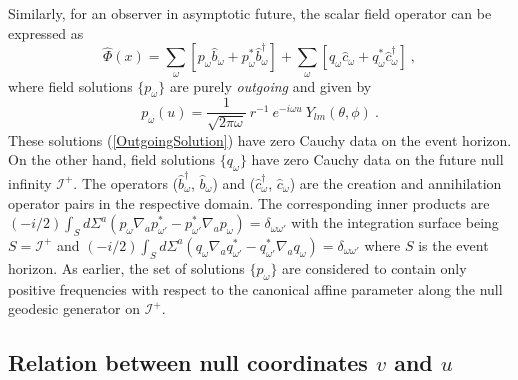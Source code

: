 \documentclass[aps,twocolumn,showpacs]{revtex4}
\def\scriplus{\mathscr{I}^{+}}
\begin{document}
Similarly, for an observer in asymptotic future, the scalar field operator 
can be expressed as 
%
\begin{equation}\label{ScalarFieldFutureOperator}
\hat{\Phi}(x) = 
\sum_{\omega} \left[ {p}_{\omega} \hat{b}_{\omega} + {p}^{*}_{\omega} 
\hat{b}^{\dagger}_{\omega} \right]
+
\sum_{\omega} \left[ {q}_{\omega} \hat{c}_{\omega} + {q}^{*}_{\omega} 
\hat{c}^{\dagger}_{\omega} \right]
~,
\end{equation}
%
where field solutions $\{{p}_{\omega}\}$ are purely \emph{outgoing} and 
given by
%
\begin{equation}\label{OutgoingSolution}
{p}_{\omega}(u) = \frac{1}{\sqrt{2\pi\omega}} ~ r^{-1}~ 
e^{-i\omega u} ~Y_{lm}(\theta,\phi) ~.
\end{equation}
%
These solutions (\ref{OutgoingSolution}) have zero Cauchy data on the event 
horizon. On the other hand, field solutions $\{{q}_{\omega}\}$ have zero Cauchy 
data on the future null infinity $\scriplus$. The operators 
($\hat{b}^{\dagger}_{\omega}$, $\hat{b}_{\omega}$) and 
($\hat{c}^{\dagger}_{\omega}$, $\hat{c}_{\omega}$) are the creation and 
annihilation operator pairs in the respective domain. The corresponding inner 
products are 
%
$(-i/2)\int_{S}d\Sigma^{a} \left({p}_{\omega} \nabla_a {p}^{*}_{\omega'} 
-{p}^{*}_{\omega'} \nabla_a {p}_{\omega} \right) = \delta_{\omega\omega'}$ 
%
with the integration surface being $S = \scriplus$ and 
%
$(-i/2)\int_{S}d\Sigma^{a} 
\left({q}_{\omega} \nabla_a {q}^{*}_{\omega'} -{q}^{*}_{\omega'} \nabla_a 
{q}_{\omega} \right) = \delta_{\omega\omega'}$ 
%
where $S$ is the event horizon. As earlier, the set of solutions 
$\{{p}_{\omega}\}$ are considered to contain only positive frequencies
with respect to the canonical affine parameter along the null geodesic 
generator on $\scriplus$.

%


\subsection{Relation between null coordinates $v$ and $u$}
\end{document}
